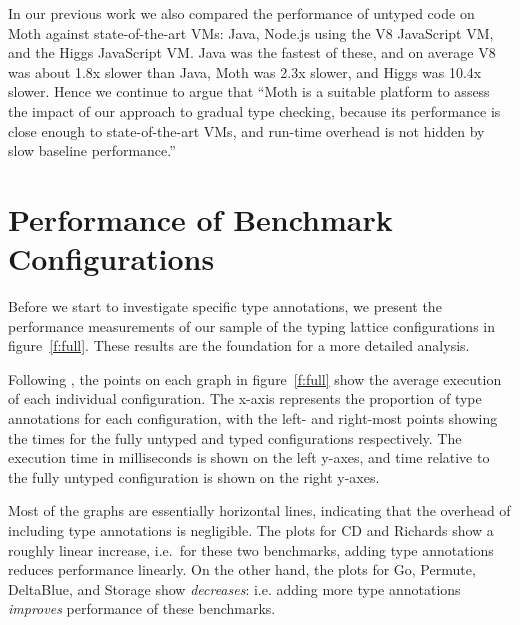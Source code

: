 \documentclass[sigplan,screen]{acmart}
\begin{document}
In our previous work we also compared the performance of untyped code on Moth against state-of-the-art VMs: Java, Node.js using the V8 JavaScript VM, and the Higgs JavaScript VM. Java was the fastest of these, and on average V8 was about 1.8x slower than Java, Moth was 2.3x slower, and Higgs was 10.4x slower.
Hence we continue to argue that ``Moth is a suitable platform to assess the impact of our approach to gradual type checking, because its performance is close enough to state-of-the-art VMs, and run-time overhead is not hidden by slow baseline performance.''

\section{Performance of Benchmark Configurations}
\label{s-overall}

\begin{figure*}
	
	\caption{Graphs of (at most) 102 configurations in the typing lattices for each benchmark. Time is measured as the mean of the 351\textsuperscript{st} to the 1,000\textsuperscript{th} benchmark iteration under a single invocation of Moth (lower is better).}
	\label{f:full}
\end{figure*}

Before we start to investigate specific type annotations,
we present the performance measurements of our sample of the typing lattice configurations in figure~\ref{f:full}.
These results are the foundation for a more detailed analysis.

Following \cite{vitousek-transient-arXive-2019}, the points on each graph in figure~\ref{f:full} show the average execution of each individual configuration. The x-axis represents the proportion of type annotations for each configuration, with the left- and right-most points showing the times for the fully untyped and typed configurations respectively. The execution time in milliseconds is shown on the left y-axes, and time relative to the fully untyped configuration is shown on the right y-axes.

Most of the graphs are essentially horizontal lines, indicating that the overhead of including type annotations is negligible. The plots for CD and Richards show a roughly linear increase, i.e.\ for these two benchmarks, adding type annotations reduces performance linearly. On the other hand, the plots for Go, Permute, DeltaBlue, and Storage show \emph{decreases}: i.e. adding more type annotations \emph{improves} performance of these benchmarks.
\end{document}
